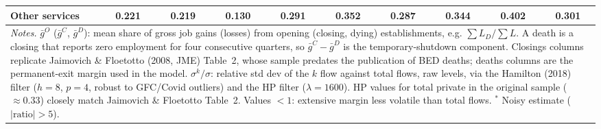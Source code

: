 \begin{table}[htbp]
\begin{tabular}{lccccccccc}
Other services & 0.221 & 0.219 & 0.130 & 0.291 & 0.352 & 0.287 & 0.344 & 0.402 & 0.301 \\
\midrule
\multicolumn{10}{p{0.98\linewidth}}{\footnotesize \textit{Notes.} $\bar{g}^O$ ($\bar{g}^C$, $\bar{g}^D$): mean share of gross job gains (losses) from opening (closing, dying) establishments, e.g. $\sum L_D/\sum L$. A death is a closing that reports zero employment for four consecutive quarters, so $\bar{g}^C-\bar{g}^D$ is the temporary-shutdown component. Closings columns replicate Jaimovich \& Floetotto (2008, JME) Table~2, whose sample predates the publication of BED deaths; deaths columns are the permanent-exit margin used in the model. $\sigma^k/\sigma$: relative std dev of the $k$ flow against total flows, raw levels, via the Hamilton (2018) filter ($h{=}8$, $p{=}4$, robust to GFC/Covid outliers) and the HP filter ($\lambda{=}1600$). HP values for total private in the original sample ($\approx 0.33$) closely match Jaimovich \& Floetotto Table~2. Values $<1$: extensive margin less volatile than total flows. $^{*}$ Noisy estimate ($|\text{ratio}|>5$).} \\
\bottomrule
\end{tabular}
\end{table}
